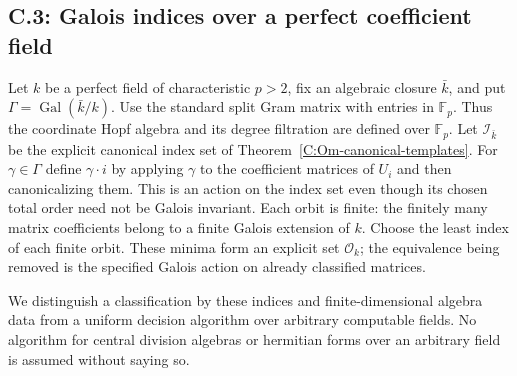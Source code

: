 \subsection{C.3: Galois indices over a perfect coefficient field}

Let $k$ be a perfect field of characteristic $p>2$, fix an algebraic
closure $\bar k$, and put $\Gamma=\operatorname{Gal}(\bar k/k)$.
Use the standard split Gram matrix with entries in $\mathbb F_p$.
Thus the coordinate Hopf algebra and its degree filtration are defined
over $\mathbb F_p$. Let $\mathscr I_{\bar k}$ be the explicit canonical
index set of Theorem~\ref{C:Om-canonical-templates}.
For $\gamma\in\Gamma$ define $\gamma\cdot i$ by applying $\gamma$
to the coefficient matrices of $U_i$ and then canonicalizing them.
This is an action on the index set even though its chosen total order
need not be Galois invariant. Each orbit is finite: the finitely many
matrix coefficients belong to a finite Galois extension of $k$.
Choose the least index of each finite orbit. These minima form an
explicit set $\mathscr O_k$; the equivalence being removed is the
specified Galois action on already classified matrices.

We distinguish a classification by these indices and finite-dimensional
algebra data from a uniform decision algorithm over arbitrary computable
fields. No algorithm for central division algebras or hermitian forms
over an arbitrary field is assumed without saying so.

